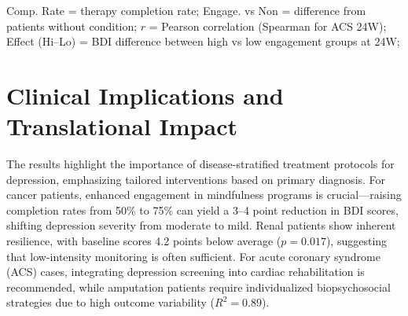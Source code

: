 \documentclass[conference]{IEEEtran}
\begin{document}
\begin{table}[ht]
\centering
\caption{Therapy Engagement and Depression Outcomes by Medical Condition}
\parbox[t]{\linewidth}{\footnotesize
Comp. Rate = therapy completion rate; Engage. vs Non = difference from patients without condition; 
$r$ = Pearson correlation (Spearman for ACS 24W); Effect (Hi–Lo) = BDI difference between high vs low engagement groups at 24W; }
\label{tab:therapy_engagement}
\end{table}
\section{Clinical Implications and Translational Impact}

The results highlight the importance of disease-stratified treatment protocols for depression, emphasizing tailored interventions based on primary diagnosis. For cancer patients, enhanced engagement in mindfulness programs is crucial—raising completion rates from 50\% to 75\% can yield a 3--4 point reduction in BDI scores, shifting depression severity from moderate to mild. Renal patients show inherent resilience, with baseline scores 4.2 points below average ($p=0.017$), suggesting that low-intensity monitoring is often sufficient. For acute coronary syndrome (ACS) cases, integrating depression screening into cardiac rehabilitation is recommended, while amputation patients require individualized biopsychosocial strategies due to high outcome variability ($R^2=0.89$).
\end{document}
